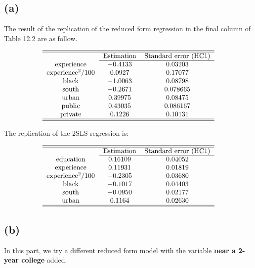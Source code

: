 \documentclass{article}
\begin{document}
\subsection*{(a)}

The result of the replication of the reduced form regression in the final
column of Table 12.2 are as follow.

\begin{equation*}
\begin{tabular}{ccc}
\hline\hline
& Estimation & Standard error (HC1) \\ \cline{2-3}
experience & $-0.4133$ & $0.03203$ \\ 
experience$^{2}/100$ & $0.0927$ & $0.17077$ \\ 
black & $-1.0063$ & $0.08798$ \\ 
south & $-0.2671$ & $0.078665$ \\ 
urban & $0.39975$ & $0.08475$ \\ 
public & $0.43035$ & $0.086167$ \\ 
private & $0.1226$ & $0.10131$ \\ \hline\hline
\end{tabular}%
\end{equation*}

The replication of the 2SLS regression is:

\begin{equation*}
\begin{tabular}{ccc}
\hline\hline
& Estimation & Standard error (HC1) \\ \cline{2-3}
education & $0.16109$ & $0.04052$ \\ 
experience & $0.11931$ & $0.01819$ \\ 
experience$^{2}/100$ & $-0.2305$ & $0.03680$ \\ 
black & $-0.1017$ & $0.04403$ \\ 
south & $-0.0950$ & $0.02177$ \\ 
urban & $0.1164$ & $0.02630$ \\ \hline\hline
\end{tabular}%
\end{equation*}

\subsection*{(b)}

In this part, we try a different reduced form model with the variable 
\textbf{near a 2-year college} added.
\end{document}
